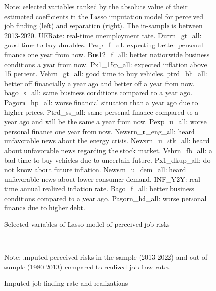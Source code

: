     \begin{figure}[ht]
    	\caption{Selected variables of Lasso model of perceived job risks}
    	\label{fig:vars_rank}
    	\begin{center}

    	\end{center}
    	
    	\begin{flushleft}\footnotesize{Note: selected variables ranked by the absolute value of their estimated coefficients in the Lasso imputation model for perceived job finding (left) and separation (right). The in-sample is between 2013-2020. UERate: real-time unemployment rate. Durrn\_gt\_all: good time to buy durables. Pexp\_f\_all: expecting better personal finance one year from now. Bus12\_f\_all: better nationwide business conditions a year from now. Px1\_15p\_all: expected inflation above 15 percent. Vehrn\_gt\_all: good time to buy vehicles. ptrd\_bb\_all: better off financially a year ago and better off a year from now. bago\_s\_all: same business conditions compared to a year ago. Pagorn\_hp\_all: worse financial situation than a year ago due to higher prices. Ptrd\_ss\_all: same personal finance compared to a year ago and will be the same a year from now. Pexp\_u\_all: worse personal finance one year from now. Newsrn\_u\_eng\_all: heard unfavorable news about the energy crisis. Newsrn\_u\_stk\_all: heard about unfavorable news regarding the stock market. Vehrn\_fb\_all: a bad time to buy vehicles due to uncertain future. Px1\_dkup\_all: do not know about future inflation. Newsrn\_u\_dem\_all: heard unfavorable news about lower consumer demand. INF\_Y2Y: real-time annual realized inflation rate. Bago\_f\_all: better business conditions compared to a year ago. Pagorn\_hd\_all: worse personal finance due to higher debt.}  \end{flushleft}
    \end{figure}

   \begin{figure}[ht]
    	\caption{Imputed job finding rate and realizations}
    	\label{fig:impute_comparison_1step}
    	\begin{center}
	 \\
    	\end{center}
    	\begin{flushleft}\footnotesize{Note: imputed perceived risks in the sample (2013-2022) and out-of-sample (1980-2013) compared to realized job flow rates.} \end{flushleft}
    \end{figure}



